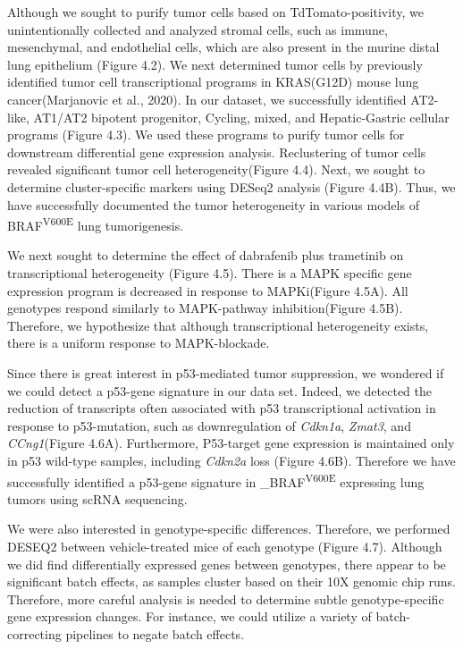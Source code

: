 Although we sought to purify tumor cells based on TdTomato-positivity, we unintentionally collected and analyzed stromal cells, such as immune, mesenchymal, and endothelial cells, which are also present in the murine distal lung epithelium (Figure 4.2). We next determined tumor cells by previously identified tumor cell transcriptional programs in KRAS(G12D) mouse lung cancer(Marjanovic et al., 2020). In our dataset, we successfully identified AT2-like, AT1/AT2 bipotent progenitor, Cycling, mixed, and Hepatic-Gastric cellular programs (Figure 4.3). We used these programs to purify tumor cells for downstream differential gene expression analysis. Reclustering of tumor cells revealed significant tumor cell heterogeneity(Figure 4.4). Next, we sought to determine cluster-specific markers using DESeq2 analysis (Figure 4.4B). Thus, we have successfully documented the tumor heterogeneity in various models of BRAF\textsuperscript{V600E} lung tumorigenesis.

We next sought to determine the effect of dabrafenib plus trametinib on transcriptional heterogeneity (Figure 4.5). There is a MAPK specific gene expression program is decreased in response to MAPKi(Figure 4.5A). All genotypes respond similarly to MAPK-pathway inhibition(Figure 4.5B). Therefore, we hypothesize that although transcriptional heterogeneity exists, there is a uniform response to MAPK-blockade.

Since there is great interest in p53-mediated tumor suppression, we wondered if we could detect a p53-gene signature in our data set. Indeed, we detected the reduction of transcripts often associated with p53 transcriptional activation in response to p53-mutation, such as downregulation of \emph{Cdkn1a}, \emph{Zmat3}, and \emph{CCng1}(Figure 4.6A). Furthermore, P53-target gene expression is maintained only in p53 wild-type samples, including \emph{Cdkn2a} loss (Figure 4.6B). Therefore we have successfully identified a p53-gene signature in \_BRAF\textsuperscript{V600E} expressing lung tumors using scRNA sequencing.

We were also interested in genotype-specific differences. Therefore, we performed DESEQ2 between vehicle-treated mice of each genotype (Figure 4.7). Although we did find differentially expressed genes between genotypes, there appear to be significant batch effects, as samples cluster based on their 10X genomic chip runs. Therefore, more careful analysis is needed to determine subtle genotype-specific gene expression changes. For instance, we could utilize a variety of batch-correcting pipelines to negate batch effects.

